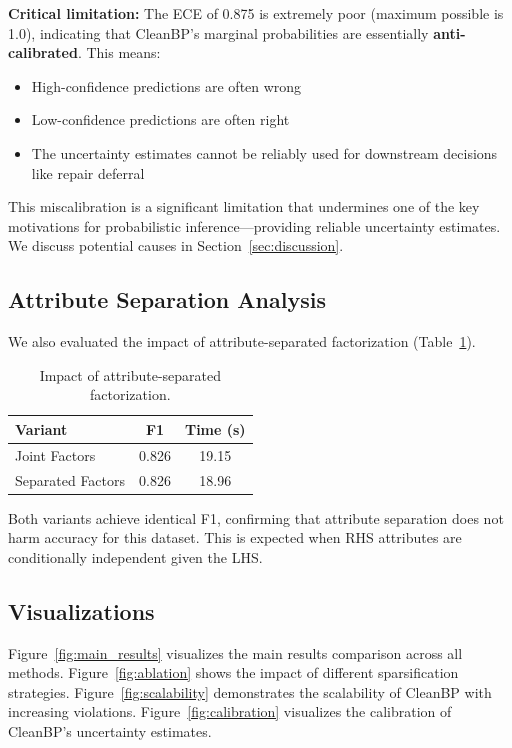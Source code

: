 \documentclass{article}
\begin{document}
\textbf{Critical limitation:} The ECE of 0.875 is extremely poor (maximum possible is 1.0), indicating that CleanBP's marginal probabilities are essentially \textbf{anti-calibrated}. This means:
\begin{itemize}
    \item High-confidence predictions are often wrong
    \item Low-confidence predictions are often right
    \item The uncertainty estimates cannot be reliably used for downstream decisions like repair deferral
\end{itemize}

This miscalibration is a significant limitation that undermines one of the key motivations for probabilistic inference---providing reliable uncertainty estimates. We discuss potential causes in Section~\ref{sec:discussion}.

\subsection{Attribute Separation Analysis}

We also evaluated the impact of attribute-separated factorization (Table~\ref{tab:attribute_sep}).

\begin{table}[t]
\centering
\caption{Impact of attribute-separated factorization.}
\label{tab:attribute_sep}
\begin{tabular}{lcc}
\toprule
Variant & F1 & Time (s) \\
\midrule
Joint Factors & 0.826 & 19.15 \\
Separated Factors & 0.826 & 18.96 \\
\bottomrule
\end{tabular}
\end{table}

Both variants achieve identical F1, confirming that attribute separation does not harm accuracy for this dataset. This is expected when RHS attributes are conditionally independent given the LHS.

\subsection{Visualizations}

Figure~\ref{fig:main_results} visualizes the main results comparison across all methods. Figure~\ref{fig:ablation} shows the impact of different sparsification strategies. Figure~\ref{fig:scalability} demonstrates the scalability of CleanBP with increasing violations. Figure~\ref{fig:calibration} visualizes the calibration of CleanBP's uncertainty estimates.
\end{document}
